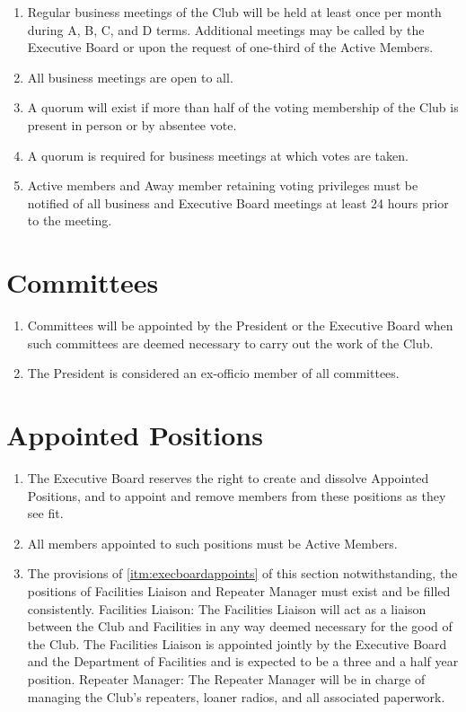 \documentclass[12pt,letterpaper,oneside]{book}
\begin{document}
\begin{enumerate}

\item Regular business meetings of the Club will be held at least once per month during A, B, C, and D terms. Additional meetings may be called by the Executive Board or upon the request of one-third of the Active Members.
\item All business meetings are open to all.
\item A quorum will exist if more than half of the voting membership of the Club is present in person or by absentee vote.
\item A quorum is required for business meetings at which votes are taken.
\item Active members and Away member retaining voting privileges must be notified of all business and Executive Board meetings at least 24 hours prior to the meeting.

\end{enumerate}

\chapter{Committees}

\begin{enumerate}

\item Committees will be appointed by the President or the Executive Board when such committees are deemed necessary to carry out the work of the Club.
\item The President is considered an ex-officio member of all committees.

\end{enumerate}

\chapter{Appointed Positions}

\begin{enumerate}

\item  The Executive Board reserves the right to create and dissolve Appointed Positions, and to appoint and remove members from these positions as they see fit.
\item All members appointed to such positions must be Active Members.
\item The provisions of \cref{itm:execboardappoints} of this section notwithstanding, the positions of Facilities Liaison and Repeater Manager must exist and be filled consistently.
\subitem Facilities Liaison: The Facilities Liaison will act as a liaison between the Club and Facilities in any way deemed necessary for the good of the Club. The Facilities Liaison is appointed jointly by the Executive Board and the Department of Facilities and is expected to be a three and a half year position.
\subitem Repeater Manager: The Repeater Manager will be in charge of managing the Club’s repeaters, loaner radios, and all associated paperwork.

\end{enumerate}
\end{document}
